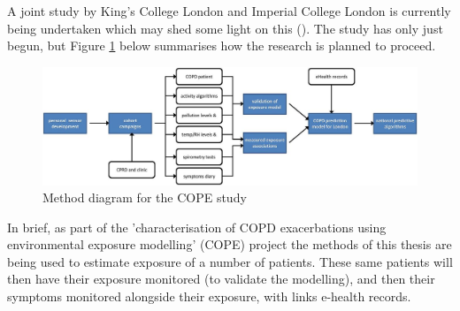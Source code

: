 A joint study by King's College London and Imperial College London is currently being undertaken which may shed some light on this (\cite{Moore2016}). The study has only just begun, but Figure \ref{fig:cope_method_diagram} below summarises how the research is planned to proceed.

\begin{figure}[H]
\centering
\includegraphics[scale=0.6]{images/cope_method_diagram.jpg}
\caption{Method diagram for the COPE study}
\label{fig:cope_method_diagram}
\end{figure}

In brief, as part of the 'characterisation of COPD exacerbations using environmental exposure modelling' (COPE) project the methods of this thesis are being used to estimate exposure of a number of patients. These same patients will then have their exposure monitored (to validate the modelling), and then their symptoms monitored alongside their exposure, with links e-health records.